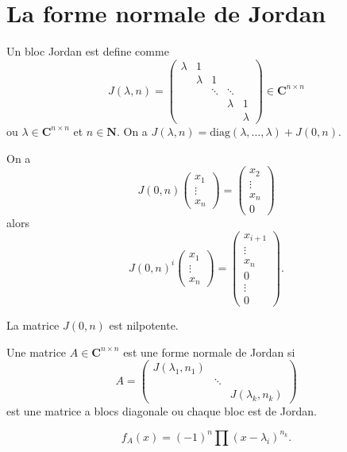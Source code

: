 \chapter{La forme normale de Jordan}
\begin{definition}
Un bloc Jordan est define comme
$$
J(\lambda,n)=\begin{pmatrix}
\lambda & 1 &  &  &  \\
 & \lambda & 1 &  & \\
 &  &  \ddots &  \ddots\\
 &  &  &  \lambda & 1 \\
 &  &  &  & \lambda
\end{pmatrix}\in \mathbf{C}^{n\times n}
$$
ou $\lambda \in \mathbf{C}^{n\times n}$ et $n\in \mathbf{N}$. On a $J(\lambda,n)=\mathrm{diag}(\lambda,\dots,\lambda)+J(0,n)$.
\end{definition}

On a 
$$
J(0,n)\begin{pmatrix}
x_{1} \\
\vdots \\
x_{n}
\end{pmatrix}=\begin{pmatrix}
x_{2}  \\
\vdots  \\
x_{n} \\
0
\end{pmatrix}
$$
alors
$$
J(0,n)^{i}\begin{pmatrix}
x_{1} \\
\vdots  \\
x_{n}
\end{pmatrix}=\begin{pmatrix}
x_{i+1} \\
\vdots \\
x_{n} \\
0 \\
\vdots \\
0
\end{pmatrix}.
$$

La matrice $J(0,n)$ est nilpotente.
\begin{definition}
Une matrice $A\in \mathbf{C}^{n\times n}$ est une forme normale de Jordan si
$$
A=\begin{pmatrix}
J(\lambda_{1},n_{1}) &  &  \\
 &  \ddots &  \\
 &  &   J(\lambda _{k},n_{k} )
\end{pmatrix}
$$
est une matrice a blocs diagonale ou chaque bloc est de Jordan.
\end{definition}
\begin{remark}
$$
f_{A}(x)=(-1)^{n}\prod(x-\lambda _{i})^{n_{k}}.
$$
\end{remark}